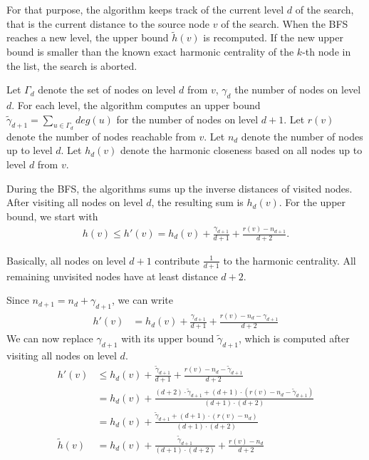 For that purpose, the algorithm keeps track of the current level $d$ of the search, that is the current distance to the source node $v$ of the search. When the BFS reaches a new level, the upper bound $\widetilde{h}(v)$ is recomputed. If the new upper bound is smaller than the known exact harmonic centrality of the $k$-th node in the list, the search is aborted. 

Let $\Gamma_d$ denote the set of nodes on level $d$ from $v$, $\gamma_d$ the number of nodes on level $d$. For each level, the algorithm computes an upper bound $\widetilde{\gamma}_{d+1} = \sum_{u \in \Gamma_d}{deg(u)}$ for the number of nodes on level $d + 1$. Let $r(v)$ denote the number of nodes reachable from $v$. Let $n_d$ denote the number of nodes up to level $d$. Let $h_d(v)$ denote the harmonic closeness based on all nodes up to level $d$ from $v$.

During the BFS, the algorithms sums up the inverse distances of visited nodes. After visiting all nodes on level $d$, the resulting sum is $h_d(v)$. For the upper bound, we start with
\begin{align}
	h(v) \leq h'(v) = h_d(v) + \frac{\gamma_{d+1}}{d+1} + \frac{r(v) - n_{d+1}}{d+2}.
\end{align}

Basically, all nodes on level $d + 1$ contribute $\frac{1}{d+1}$ to the harmonic centrality. All remaining unvisited nodes have at least distance $d + 2$.

Since $n_{d + 1} = n_d + \gamma_{d+1}$, we can write
\begin{align}
	         h'(v)   &= h_d(v) + \frac{\gamma_{d+1}}{d+1} + \frac{r(v) - n_{d} - \gamma_{d+1}}{d+2}
\end{align}
We can now replace $\gamma_{d+1}$ with its upper bound $\widetilde{\gamma}_{d+1}$, which is computed after visiting all nodes on level $d$.
\begin{align}
	          h'(v)  &\leq h_d(v) + \frac{\widetilde{\gamma}_{d+1}}{d+1} + \frac{r(v) - n_{d} - \widetilde{\gamma}_{d+1}}{d+2} \label{eq:harmonicClosenessEstimate} \\
	                 &= h_d(v) + \frac{(d + 2) \cdot \widetilde{\gamma}_{d+1} + (d+1) \cdot \left(r(v) - n_{d} - \widetilde{\gamma}_{d+1}\right)}{(d+1) \cdot (d+2)} \\
	                 &= h_d(v) + \frac{\widetilde{\gamma}_{d+1} + (d+1) \cdot \left(r(v) - n_{d} \right)}{(d+1) \cdot (d+2)} \\
  \widetilde{h}(v)   &= h_d(v) + \frac{\widetilde{\gamma}_{d+1}}{(d+1) \cdot (d+2)} + \frac{r(v) - n_{d}}{d+2} \label{eq:harmonicClosenessUpperBound}
  \end{align}


